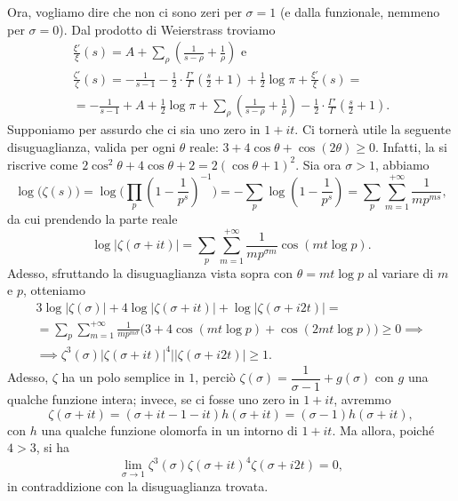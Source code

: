 Ora, vogliamo dire che non ci sono zeri per $\sigma=1$ (e dalla funzionale, nemmeno per $\sigma=0$). Dal prodotto di Weierstrass troviamo
\begin{gather*}
  \frac{\xi'}{\xi}(s)=A+\sum_{\rho} \left(\frac{1}{s-\rho}+\frac{1}{\rho}\right)\text{ e} \\
  \frac{\zeta'}{\zeta}(s)=-\frac{1}{s-1}-\frac{1}{2}\cdot\frac{\Gamma'}{\Gamma}\left(\frac{s}{2}+1\right)+\frac{1}{2}\log{\pi}+\frac{\xi'}{\xi}(s)=\\
  =-\frac{1}{s-1}+A+\frac{1}{2}\log{\pi}+\sum_{\rho} \left(\frac{1}{s-\rho}+\frac{1}{\rho}\right)-\frac{1}{2}\cdot\frac{\Gamma'}{\Gamma}\left(\frac{s}{2}+1\right).
\end{gather*}
Supponiamo per assurdo che ci sia uno zero in $1+it$. Ci tornerà utile la seguente disuguaglianza, valida per ogni $\theta$ reale: $3+4\cos{\theta}+\cos(2\theta) \ge 0$. Infatti, la si riscrive come $2\cos^2{\theta}+4\cos{\theta}+2=2(\cos{\theta}+1)^2$. Sia ora $\sigma>1$, abbiamo
$$\log\big(\zeta(s)\big)=\log\Bigg(\prod_p\left(1-\frac{1}{p^s}\right)^{-1}\Bigg)=-\sum_p \log\left(1-\frac{1}{p^s}\right)=\sum_p\sum_{m=1}^{+\infty} \frac{1}{mp^{ms}},$$
da cui prendendo la parte reale
$$\log|\zeta(\sigma+it)|=\sum_p \sum_{m=1}^{+\infty} \frac{1}{mp^{\sigma m}}\cos(mt\log{p}).$$
Adesso, sfruttando la disuguaglianza vista sopra con $\theta=mt\log{p}$ al variare di $m$ e $p$, otteniamo
\begin{gather*}
  3\log|\zeta(\sigma)|+4\log|\zeta(\sigma+it)|+\log|\zeta(\sigma+i2t)|= \\
  =\sum_p \sum_{m=1}^{+\infty} \frac{1}{mp^{m\sigma}}\big(3+4\cos(mt\log{p})+\cos(2mt\log{p})\big) \ge 0 \implies \\
  \implies \zeta^3(\sigma)|\zeta(\sigma+it)|^4||\zeta(\sigma+i2t)| \ge 1.
\end{gather*}
Adesso, $\zeta$ ha un polo semplice in $1$, perciò $\zeta(\sigma)=\dfrac{1}{\sigma-1}+g(\sigma)$ con $g$ una qualche funzione intera; invece, se ci fosse uno zero in $1+it$, avremmo
$$\zeta(\sigma+it)=(\sigma+it-1-it)h(\sigma+it)=(\sigma-1)h(\sigma+it),$$
con $h$ una qualche funzione olomorfa in un intorno di $1+it$. Ma allora, poiché $4>3$, si ha
$$\lim_{\sigma \longrightarrow 1} \zeta^3(\sigma)\zeta(\sigma+it)^4\zeta(\sigma+i2t)=0,$$
in contraddizione con la disuguaglianza trovata.

